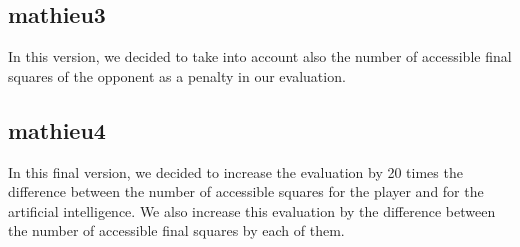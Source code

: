 \documentclass[a4paper, 11pt]{article}
\begin{document}
\subsection{mathieu3}
In this version, we decided to take into account also the number of accessible final squares of the opponent as a penalty in our evaluation.

\subsection{mathieu4}
In this final version, we decided to increase the evaluation by 20 times the difference between the number of accessible squares for the player and for the artificial intelligence. We also increase this evaluation by the difference between the number of accessible final squares by each of them.
\end{document}
